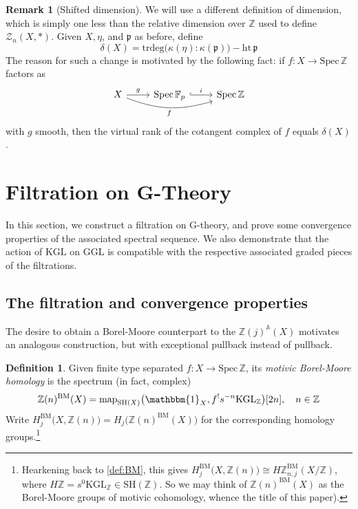 \documentclass[11pt, twoside]{article}
\numberwithin{equation}{section}
\theoremstyle{definition}
\newtheorem{definition}[equation]{Definition}
\newtheorem{remark}[equation]{Remark}
\newcommand{\bb}[1]{\mathbb{#1}}
\newcommand{\p}{\mathfrak{p}}
\newcommand{\spec}{\mathrm{Spec} \,}
\newcommand{\trd}{\mathrm{trdeg}}
\newcommand{\map}{\mathrm{map}}
\newcommand{\Kgl}{\mathrm{KGL}}
\newcommand{\Ggl}{\mathrm{GGL}}
\newcommand{\sh}{\mathrm{SH}}
\newcommand{\bm}{\mathrm{BM}}
\begin{document}
\begin{remark}[Shifted dimension] We will use a different definition of dimension, which is simply one less than the relative dimension over \(\bb{Z}\) used to define \(\mathcal{Z}_n(X, *)\). Given \(X, \eta\), and \(\p\) as before, define 
\[\delta(X) = \trd\big(\kappa(\eta) : \kappa(\p)\big) - \mathrm{ht} \, \p\]
The reason for such a change is motivated by the following fact: if \(f \colon X \to \spec \bb{Z}\) factors as 
\[\begin{tikzcd} X \ar[rr, "f", swap, bend right = 19] \ar[r, "g"] & \spec \bb{F}_p \ar[r, "i", hookrightarrow] & \spec \bb{Z} \end{tikzcd}\]
with \(g\) smooth, then the virtual rank of the cotangent complex of \(f\) equals \(\delta(X)\). 
\end{remark}


\section{Filtration on G-Theory}\label{G-fil}

In this section, we construct a filtration on G-theory, and prove some convergence properties of the associated spectral sequence. We also demonstrate that the action of \(\Kgl\) on \(\Ggl\) is compatible with the respective associated graded pieces of the filtrations.

\subsection{The filtration and convergence properties}

The desire to obtain a Borel-Moore counterpart to the \(\bb{Z}(j)^\bb{A}(X)\) motivates an analogous construction, but with exceptional pullback instead of pullback.

\begin{definition}
Given finite type separated \(f \colon X \to \spec \bb{Z}\), its \emph{motivic Borel-Moore homology} is the spectrum (in fact, complex) 
\[\bb{Z}(n)^\bm(X) = \map_{\sh(X)}\big(\mathbbm{1}_X, f^! s^{- n} \Kgl_\bb{Z}\big)\lbrack 2n \rbrack, \quad n \in \bb{Z}\]
Write \(H_j^\bm\big(X, \bb{Z}(n)\big) = H_j\big(\bb{Z}(n)^\bm(X)\big)\) for the corresponding homology groups.\footnote{Hearkening back to \ref{def:BM}, this gives \(H_j^\bm\big(X, \bb{Z}(n)\big) \cong H\bb{Z}_{n, j}^\bm(X/\bb{Z})\), where \(H\bb{Z} = s^0 \Kgl_\bb{Z} \in \sh(\bb{Z})\). So we may think of \(\bb{Z}(n)^\bm(X)\) as the Borel-Moore groups of motivic cohomology, whence the title of this paper).}
\end{definition}
\end{document}
